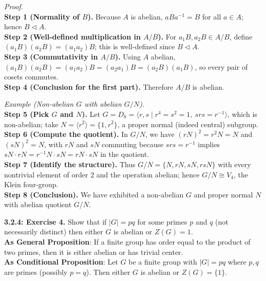 \documentclass[12pt]{article}
\theoremstyle{definition}
\begin{document}
\dotfill

\emph{Proof.}\\
\textbf{Step 1 (Normality of $B$).} Because $A$ is abelian, $aBa^{-1}=B$ for all $a\in A$; hence $B\lhd A$.\\
\textbf{Step 2 (Well-defined multiplication in $A/B$).} For $a_1B,a_2B\in A/B$, define $(a_1B)(a_2B)=(a_1a_2)B$; this is well-defined since $B\lhd A$.\\
\textbf{Step 3 (Commutativity in $A/B$).} Using $A$ abelian, $(a_1B)(a_2B)=(a_1a_2)B=(a_2a_1)B=(a_2B)(a_1B)$, so every pair of cosets commutes.\\
\textbf{Step 4 (Conclusion for the first part).} Therefore $A/B$ is abelian.\\

\dotfill

\emph{Example (Non-abelian $G$ with abelian $G/N$).}\\
\textbf{Step 5 (Pick $G$ and $N$).} Let $G=D_8=\langle r,s\mid r^4=s^2=1,\ srs=r^{-1}\rangle$, which is non-abelian; take $N=\langle r^2\rangle=\{1,r^2\}$, a proper normal (indeed central) subgroup.\\
\textbf{Step 6 (Compute the quotient).} In $G/N$, we have $(rN)^2=r^2N=N$ and $(sN)^2=N$, with $rN$ and $sN$ commuting because $srs=r^{-1}$ implies $sN\cdot rN=r^{-1}N\cdot sN=rN\cdot sN$ in the quotient.\\
\textbf{Step 7 (Identify the structure).} Thus $G/N=\{N,rN,sN,rsN\}$ with every nontrivial element of order $2$ and the operation abelian; hence $G/N\cong V_4$, the Klein four-group.\\
\textbf{Step 8 (Conclusion).} We have exhibited a non-abelian $G$ and proper normal $N$ with abelian quotient $G/N$.\\

\newpage

\noindent \textbf{3.2.4: Exercise 4.} Show that if $|G|=pq$ for some primes $p$ and $q$ (not necessarily distinct) then either $G$ is abelian or $Z(G)=1$.\\ %

\noindent\textbf{As General Proposition}: If a finite group has order equal to the product of two primes, then it is either abelian or has trivial center.\\

\noindent \textbf{As Conditional Proposition}: Let $G$ be a finite group with $|G|=pq$ where $p,q$ are primes (possibly $p=q$). Then either $G$ is abelian or $Z(G)=\{1\}$.\\
\end{document}
